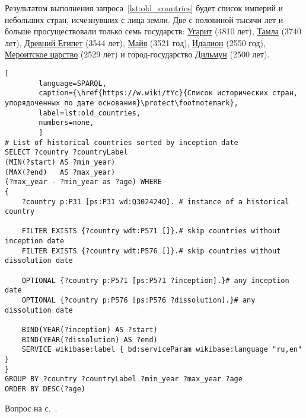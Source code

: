 \begin{task}
	\label{answer:old_countries}
Результатом выполнения запроса~\ref{lst:old_countries} будет список империй и небольших стран, 
    исчезнувших с лица земли. 
    Две с половиной тысячи лет и больше просуществовали только семь государств: 
    \href{https://w.wiki/vAT}{Угарит} (4810 лет), 
    \href{https://w.wiki/vAU}{Тамла} (3740 лет), 
    \href{https://w.wiki/vAX}{Древний Египет} (3544 лет), 
    \href{https://w.wiki/vAY}{Майя} (3521 год), 
    \href{https://w.wiki/vAZ}{Идалион} (2550 год), 
    \href{https://w.wiki/vAb}{Мероитское царство} (2529 лет) 
    и город-государство \href{https://w.wiki/vAf}{Дильмун} (2500 лет).


\newpage
{}
\begin{lstlisting}[ 
        language=SPARQL, 
	    caption={\href{https://w.wiki/tYc}{Список исторических стран, упорядоченных по дате основания}\protect\footnotemark},
	    label=lst:old_countries,
        numbers=none,
        ]
# List of historical countries sorted by inception date
SELECT ?country ?countryLabel 
(MIN(?start) AS ?min_year)
(MAX(?end)   AS ?max_year) 
(?max_year - ?min_year as ?age) WHERE
{
    ?country p:P31 [ps:P31 wd:Q3024240]. # instance of a historical country
	
    FILTER EXISTS {?country wdt:P571 []}.# skip countries without inception date
    FILTER EXISTS {?country wdt:P576 []}.# skip countries without dissolution date
	
    OPTIONAL {?country p:P571 [ps:P571 ?inception].}# any inception date
    OPTIONAL {?country p:P576 [ps:P576 ?dissolution].}# any dissolution date
	
    BIND(YEAR(?inception) AS ?start)
    BIND(YEAR(?dissolution) AS ?end)  
    SERVICE wikibase:label { bd:serviceParam wikibase:language "ru,en" }
}
GROUP BY ?country ?countryLabel ?min_year ?max_year ?age
ORDER BY DESC(?age)
\end{lstlisting}
	
	\small{\AnswerBackref Вопрос на с.~\pageref{lst:List_of_historical_countries}.}
\end{task}



